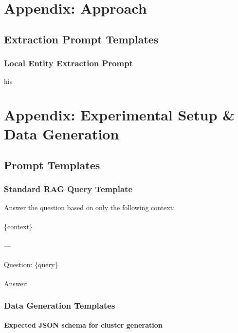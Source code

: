 \appendix

\chapter{Appendix: Approach}
\section*{Extraction Prompt Templates}
\subsection*{Local Entity Extraction Prompt}

his


\chapter{Appendix: Experimental Setup \& Data Generation}
\section*{Prompt Templates}
\subsection*{Standard RAG Query Template}\label{appendixB:std-rag-template}
\begin{tcolorbox}[title=Standard RAG Query]
Answer the question based on only the following context:\\\\
\{context\}\\\\
---\\\\
Question: \{query\}\\\\
Answer:
\end{tcolorbox}

\pagebreak

\subsection*{Data Generation Templates}
\subsubsection*{Expected JSON schema for cluster generation}

